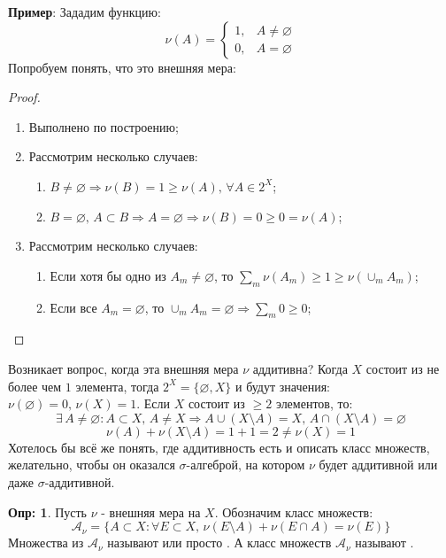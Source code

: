 \documentclass[12pt]{article}
\newcommand{\MA}{\mathcal{A}}
\newcommand{\VN}{\varnothing}
\theoremstyle{definition}
\newtheorem{defn}{Опр:}
\begin{document}
\textbf{Пример}: Зададим функцию:
$$
	\nu(A) = 
	\begin{cases}
		1, & A \neq \VN \\
		0, & A = \VN
	\end{cases}
$$
Попробуем понять, что это внешняя мера:
\begin{proof}\hfill
	\begin{enumerate}[label=\arabic*)]
		\item Выполнено по построению;
		\item  Рассмотрим несколько случаев:
		\begin{enumerate}[label=(\arabic*)]
			\item $B \neq \VN \Rightarrow \nu(B) = 1 \geq \nu(A), \, \forall A \in 2^X$;
			\item $B = \VN, \, A \subset B \Rightarrow A = \VN \Rightarrow \nu(B) = 0 \geq 0 = \nu(A)$;
		\end{enumerate}
		\item Рассмотрим несколько случаев:
		\begin{enumerate}[label=(\arabic*)]
			\item Если хотя бы одно из $A_m \neq \VN$, то $\sum_m \nu(A_m) \geq 1 \geq \nu(\cup_m A_m)$;
			\item Если все $A_m = \VN$, то $\cup_m A_m = \VN \Rightarrow \sum_m 0 \geq 0$;
		\end{enumerate}
	\end{enumerate}
\end{proof}
Возникает вопрос, когда эта внешняя мера $\nu$ аддитивна? Когда $X$ состоит из не более чем $1$ элемента, тогда $2^X = \{\VN, X\}$ и будут значения: $\nu(\VN) = 0, \, \nu(X) = 1$. Если $X$ состоит из $\geq 2$ элементов, то:
$$
	\exists \, A \neq \VN \colon A \subset X,\, A \neq X \Rightarrow A \cup (X \setminus A) = X, \, A \cap (X \setminus A) = \VN
$$
$$
	\nu(A) + \nu(X \setminus A)  = 1 + 1  = 2 \neq  \nu(X) = 1
$$
Хотелось бы всё же понять, где аддитивность есть и описать класс множеств, желательно, чтобы он оказался $\sigma$-алгеброй, на котором $\nu$ будет аддитивной или даже $\sigma$-аддитивной.

\begin{defn}
	Пусть $\nu$ - внешняя мера на $X$. Обозначим класс множеств:
	$$
		\MA_\nu = \{A \subset X \colon \forall E \subset X, \, \nu(E\setminus A) + \nu(E \cap A) = \nu(E)\}
	$$
	Множества из $\MA_\nu$ называют  или просто . А класс множеств $\MA_\nu$ называют .
\end{defn}
\end{document}
